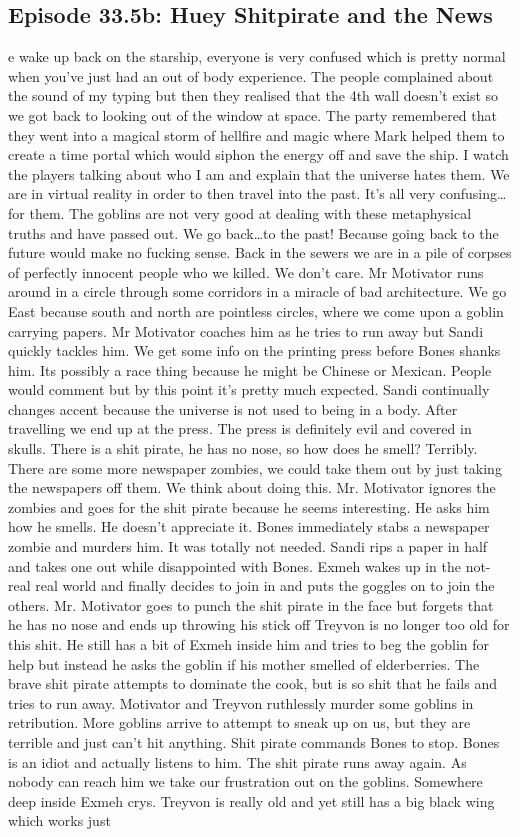 \subsection{Episode 33.5b: Huey Shitpirate and the News}
e wake up back on the starship, everyone is very confused which is pretty normal when you’ve just had an out of body experience. The people complained about the sound of my typing but then they realised that the 4th wall doesn’t exist so we got back to looking out of the window at space. The party remembered that they went into a magical storm of hellfire and magic where Mark helped them to create a time portal which would siphon the energy off and save the ship. I watch the players talking about who I am and explain that the universe hates them. We are in virtual reality in order to then travel into the past. It’s all very confusing…for them. The goblins are not very good at dealing with these metaphysical truths and have passed out. We go back…to the past! Because going back to the future would make no fucking sense. Back in the sewers we are in a pile of corpses of perfectly innocent people who we killed. We don’t care. Mr Motivator runs around in a circle through some corridors in a miracle of bad architecture. We go East because south and north are pointless circles, where we come upon a goblin carrying papers. Mr Motivator coaches him as he tries to run away but Sandi quickly tackles him. We get some info on the printing press before Bones shanks him. Its possibly a race thing because he might be Chinese or Mexican. People would comment but by this point it’s pretty much expected. Sandi continually changes accent because the universe is not used to being in a body. After travelling we end up at the press. The press is definitely evil and covered in skulls. There is a shit pirate, he has no nose, so how does he smell? Terribly. There are some more newspaper zombies, we could take them out by just taking the newspapers off them. We think about doing this. Mr. Motivator ignores the zombies and goes for the shit pirate because he seems interesting. He asks him how he smells. He doesn’t appreciate it. Bones immediately stabs a newspaper zombie and murders him. It was totally not needed. Sandi rips a paper in half and takes one out while disappointed with Bones. Exmeh wakes up in the not-real real world and finally decides to join in and puts the goggles on to join the others. Mr. Motivator goes to punch the shit pirate in the face but forgets that he has no nose and ends up throwing his stick off Treyvon is no longer too old for this shit. He still has a bit of Exmeh inside him and tries to beg the goblin for help but instead he asks the goblin if his mother smelled of elderberries. The brave shit pirate attempts to dominate the cook, but is so shit that he fails and tries to run away. Motivator and Treyvon ruthlessly murder some goblins in retribution. More goblins arrive to attempt to sneak up on us, but they are terrible and just can’t hit anything. Shit pirate commands Bones to stop. Bones is an idiot and actually listens to him. The shit pirate runs away again. As nobody can reach him we take our frustration out on the goblins. Somewhere deep inside Exmeh crys. Treyvon is really old and yet still has a big black wing which works just 